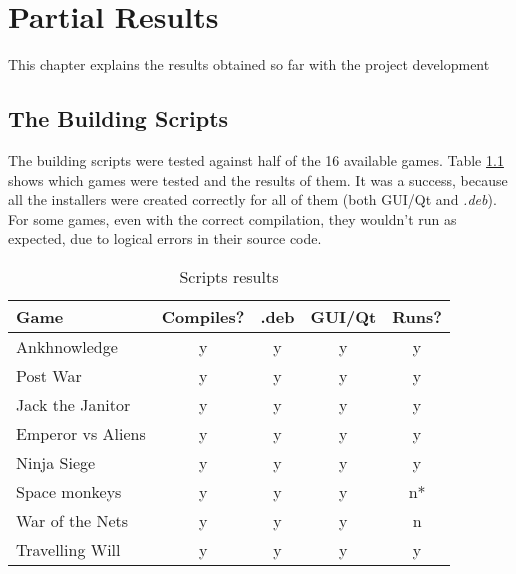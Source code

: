 \chapter[Partial Results]{Partial Results}
\label{sec:results}

This chapter explains the results obtained so far with the project development



\section{The Building Scripts}
\label{sec:building_scripts}

The building scripts were tested against half of the 16 available games. Table \ref{tab:script_games} shows which games were tested and the results of them. It was a success, because all the installers were created correctly for all of them (both GUI/Qt and \textit{.deb}). For some games, even with the correct compilation, they wouldn't run as expected, due to logical errors in their source code.

\begin{table}[h!]
\centering
\caption{Scripts results}
\label{tab:script_games}
\begin{tabular}{lcccc}
\hline
\textbf{Game} & \multicolumn{1}{l}{\textbf{Compiles?}} & \multicolumn{1}{l}{\textbf{.deb}} & \multicolumn{1}{l}{\textbf{GUI/Qt}} & \multicolumn{1}{l}{\textbf{Runs?}} \\ \hline
Ankhnowledge & y & y & y & y \\
Post War & y & y & y & y \\
Jack the Janitor & y & y & y & y \\
Emperor vs Aliens & y & y & y & y \\
Ninja Siege & y & y & y & y \\
Space monkeys & y & y & y & n* \\
War of the Nets & y & y & y & n \\
Travelling Will & y & y & y & y \\ \hline
\end{tabular}
\end{table}

